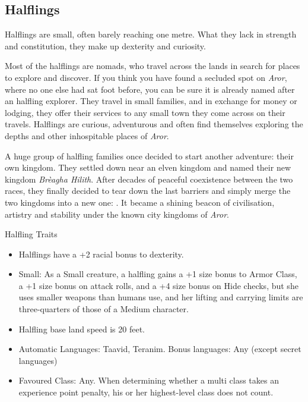 \subsection{Halflings}
\label{sec:Halflings}

Halflings are small, often barely reaching one metre. What they lack in
strength and constitution, they make up dexterity and curiosity.

Most of the halflings are nomads, who travel across the lands in search for
places to explore and discover. If you think you have found a secluded spot on
\emph{Aror}, where no one else had sat foot before, you can be sure it is
already named after an halfling explorer. They travel in small families, and
in exchange for money or lodging, they offer their services to any small town
they come across on their travels. Halflings are curious, adventurous and
often find themselves exploring the depths and other inhospitable places of
\emph{Aror}.

A huge group of halfling families once decided to start another adventure:
their own kingdom. They settled down near an elven kingdom and named their new
kingdom \emph{Brèagha Hilith}. After decades of peaceful coexistence between
the two races, they finally decided to tear down the last barriers and simply
merge the two kingdoms into a new one: . It became a
shining beacon of civilisation, artistry and stability under the known city
kingdoms of \emph{Aror}.


\begin{35e}{Halfling Traits}
  \begin{itemize}[noitemsep]
    \item Halflings have a +2 racial bonus to dexterity.
    \item Small: As a Small creature, a halfling gains a +1 size bonus to
    Armor Class, a +1 size bonus on attack rolls, and a +4 size bonus on Hide
    checks, but she uses smaller weapons than humans use, and her lifting and
    carrying limits are three-quarters of those of a Medium character.
    \item Halfling base land speed is 20 feet.
    \item Automatic Languages: Taavid, Teranim. Bonus languages: Any
    (except secret languages)
    \item Favoured Class: Any. When determining whether a multi class takes an
          experience point penalty, his or her highest-level class does not
          count.
  \end{itemize}
\end{35e}
